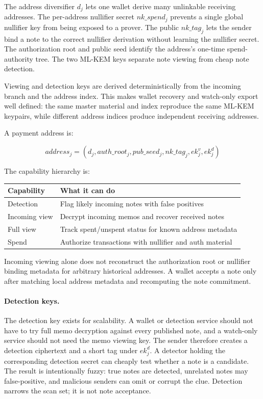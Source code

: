 \documentclass[11pt]{article}
\begin{document}
The address diversifier \(d_j\) lets one wallet derive many unlinkable receiving
addresses. The per-address nullifier secret \(nk\_spend_j\) prevents a single
global nullifier key from being exposed to a prover. The public \(nk\_tag_j\)
lets the sender bind a note to the correct nullifier derivation without learning
the nullifier secret. The authorization root and public seed identify the
address's one-time spend-authority tree. The two ML-KEM keys separate note
viewing from cheap note detection.

Viewing and detection keys are derived deterministically from the incoming
branch and the address index. This makes wallet recovery and watch-only export
well defined: the same master material and index reproduce the same ML-KEM
keypairs, while different address indices produce independent receiving
addresses.

A payment address is:

\[
address_j =
(d_j, auth\_root_j, pub\_seed_j, nk\_tag_j, ek^v_j, ek^d_j)
\]

The capability hierarchy is:

\begin{center}
\begin{tabular}{ll}
\toprule
Capability & What it can do \\
\midrule
Detection & Flag likely incoming notes with false positives \\
Incoming view & Decrypt incoming memos and recover received notes \\
Full view & Track spent/unspent status for known address metadata \\
Spend & Authorize transactions with nullifier and auth material \\
\bottomrule
\end{tabular}
\end{center}

Incoming viewing alone does not reconstruct the authorization root or nullifier
binding metadata for arbitrary historical addresses. A wallet accepts a note
only after matching local address metadata and recomputing the note commitment.

\paragraph{Detection keys.}
The detection key exists for scalability. A wallet or detection service should
not have to try full memo decryption against every published note, and a
watch-only service should not need the memo viewing key. The sender therefore
creates a detection ciphertext and a short tag under \(ek^d_j\). A detector
holding the corresponding detection secret can cheaply test whether a note is a
candidate. The result is intentionally fuzzy: true notes are detected, unrelated
notes may false-positive, and malicious senders can omit or corrupt the clue.
Detection narrows the scan set; it is not note acceptance.
\end{document}
